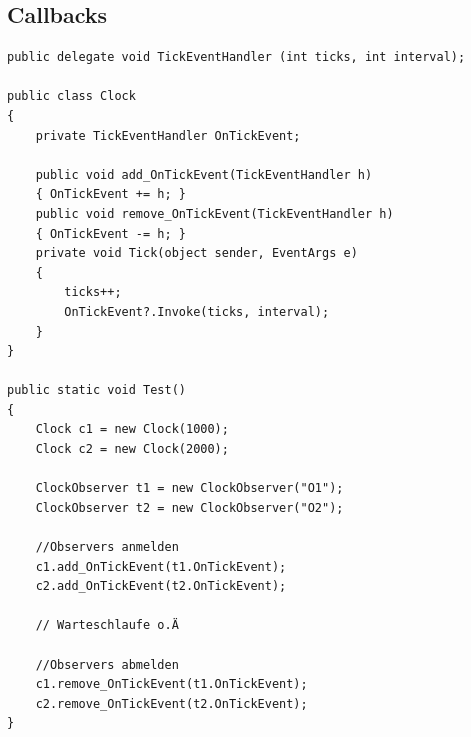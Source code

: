 \documentclass[
a4paper,
oneside,
10pt,
fleqn,
headsepline,
toc=listofnumbered, 
bibliography=totocnumbered]{scrartcl}
\begin{document}
\subsection{Callbacks}
\begin{lstlisting}
public delegate void TickEventHandler (int ticks, int interval);

public class Clock
{
    private TickEventHandler OnTickEvent;

    public void add_OnTickEvent(TickEventHandler h)
    { OnTickEvent += h; }
    public void remove_OnTickEvent(TickEventHandler h)
    { OnTickEvent -= h; }
    private void Tick(object sender, EventArgs e)
    {
        ticks++;
        OnTickEvent?.Invoke(ticks, interval);
    }
}

public static void Test()
{
    Clock c1 = new Clock(1000);
    Clock c2 = new Clock(2000);
    
    ClockObserver t1 = new ClockObserver("O1");
    ClockObserver t2 = new ClockObserver("O2");
    
    //Observers anmelden
    c1.add_OnTickEvent(t1.OnTickEvent);
    c2.add_OnTickEvent(t2.OnTickEvent);
    
    // Warteschlaufe o.Ä
    
    //Observers abmelden
    c1.remove_OnTickEvent(t1.OnTickEvent);
    c2.remove_OnTickEvent(t2.OnTickEvent);
}
\end{lstlisting}

\clearpage
\end{document}
